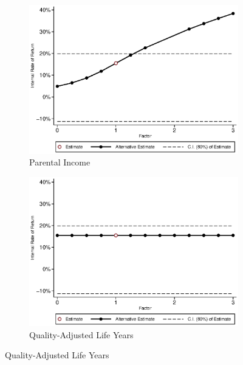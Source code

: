 \begin{figure}[H]
\ContinuedFloat	
	\begin{subfigure}[h]{0.8\textwidth}
	\centering
	\caption{Parental Income} \label{fig:irrf_inc_parent_f1}
	\includegraphics[width=\textwidth]{AppOutput/Sensitivity/irrf_inc_parent_f1.eps}
	\end{subfigure}
	
	\begin{subfigure}[h]{0.8\textwidth}
	\centering
	\caption{Quality-Adjusted Life Years} \label{fig:irrf_qaly_f1}
	\includegraphics[width=\textwidth]{AppOutput/Sensitivity/irrf_qaly_f1.eps}
	\end{subfigure}
\end{figure}
	

